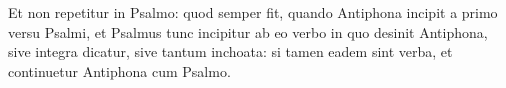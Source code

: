 Et non repetitur in Psalmo: quod semper fit, quando Antiphona incipit a primo versu Psalmi, et Psalmus tunc incipitur ab eo verbo in quo desinit Antiphona, sive integra dicatur, sive tantum inchoata: si tamen eadem sint verba, et continuetur Antiphona cum Psalmo.